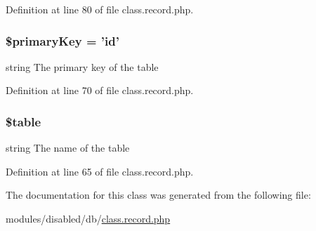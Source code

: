 Definition at line 80 of file class.\-record.\-php.

\hypertarget{class_record_a927b0256b942a3ee89485f2649af7981}{
\subsubsection[{\$primary\-Key}]{\setlength{\rightskip}{0pt plus 5cm}\$primary\-Key = 'id'\hspace{0.3cm}{\ttfamily [protected]}}}\label{class_record_a927b0256b942a3ee89485f2649af7981}
string The primary key of the table 

Definition at line 70 of file class.\-record.\-php.

\hypertarget{class_record_ae8876a14058f368335baccf35af4a22b}{
\subsubsection[{\$table}]{\setlength{\rightskip}{0pt plus 5cm}\$table\hspace{0.3cm}{\ttfamily [protected]}}}\label{class_record_ae8876a14058f368335baccf35af4a22b}
string The name of the table 

Definition at line 65 of file class.\-record.\-php.



The documentation for this class was generated from the following file\-:\begin{DoxyCompactItemize}
\item 
modules/disabled/db/\hyperlink{class_8record_8php}{class.\-record.\-php}\end{DoxyCompactItemize}
